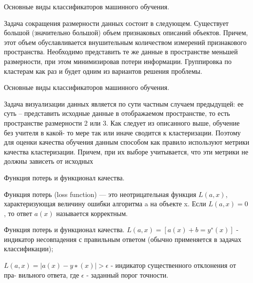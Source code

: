 \documentclass{beamer}
\begin{document}
\begin{frame}{Основные виды классификаторов машинного обучения.}


Задача сокращения размерности данных состоит в следующем.
Существует большой (значительно большой) объем признаковых
описаний объектов. Причем, этот объем обуславливается
внушительным количеством измерений признакового пространства.
Необходимо представить те же данные в пространстве меньшей
размерности, при этом минимизировав потери информации.
Группировка по кластерам как раз и будет одним из вариантов
решения проблемы.
\end{frame}


\begin{frame}{Основные виды классификаторов машинного обучения.}


Задача визуализации данных является по сути частным случаем
предыдущей: ее суть – представить исходные данные в отображаемом
пространстве, то есть пространстве размерности 2 или 3.
Как следует из описанного выше, обучение без учителя в какой-
то мере так или иначе сводится к кластеризации. Поэтому для оценки
качества обучения данным способом как правило используют
метрики качества кластеризации. Причем, при их выборе
учитывается, что эти метрики не должны зависеть от исходных

\end{frame}






\begin{frame}{Функция потерь и функционал качества.}

Функция потерь (loss function) — это неотрицательная функция $L (a, x)$,
характеризующая величину ошибки алгоритма a на объекте x. Если $L (a, x) = 0$,
то ответ $a(x)$ называется корректным.



\end{frame}


\begin{frame}{Функция потерь и функционал качества.}
$ L (a, x) = [a(x) + b = y^∗ (x)]$ - индикатор несовпадения с правильным ответом
(обычно применяется в задачах классификации);


$L (a, x) = |a(x) − y ∗ (x)| > \epsilon$  - индикатор существенного отклонения от пра-
вильного ответа, где $\epsilon$ - заданный порог точности.


\end{frame}
\end{document}
